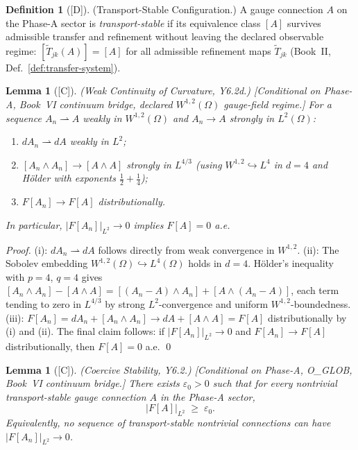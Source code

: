 \documentclass[12pt,oneside]{amsbook}
\theoremstyle{plain}
\newtheorem{lemma}[theorem]{Lemma}
\theoremstyle{definition}
\newtheorem{definition}[theorem]{Definition}
\theoremstyle{remark}
\newcommand{\status}[1]{\textup{[#1]}}
\begin{document}
\begin{definition}[\status{D}]\label{def:ym-transport-stable-config}
\textup{(Transport-Stable Configuration.)}
A gauge connection $A$ on the Phase-A sector is
\emph{transport-stable} if its equivalence class $[A]$ survives
admissible transfer and refinement without leaving the declared
observable regime: $[\widetilde{T}_{jk}(A)] = [A]$ for all
admissible refinement maps $\widetilde{T}_{jk}$ (Book~II,
Def.~\ref{def:transfer-system}).
\end{definition}

\begin{lemma}[\status{C}]\label{lem:ym-weak-curvature-continuity}
\textup{(Weak Continuity of Curvature, Y6.2d.)}
\textup{[Conditional on Phase-A, Book~VI continuum bridge, declared
$W^{1,2}(\Omega)$ gauge-field regime.]}
For a sequence $A_n \rightharpoonup A$ weakly in
$W^{1,2}(\Omega)$ and $A_n \to A$ strongly in $L^2(\Omega)$:
\begin{enumerate}[label=\textup{(\roman*)}]
 \item $dA_n \rightharpoonup dA$ weakly in $L^2$;
 \item $[A_n \wedge A_n] \to [A \wedge A]$ strongly in
 $L^{4/3}$ (using $W^{1,2} \hookrightarrow L^4$ in
 $d=4$ and H\"older with exponents $\tfrac{1}{2}+\tfrac{1}{4}$);
 \item $F[A_n] \to F[A]$ distributionally.
\end{enumerate}
In particular, $|F[A_n]|_{L^2} \to 0$ implies $F[A]=0$ a.e.
\end{lemma}

\begin{proof}
(i): $dA_n \rightharpoonup dA$ follows directly from weak
convergence in $W^{1,2}$.
(ii): The Sobolev embedding $W^{1,2}(\Omega) \hookrightarrow
L^4(\Omega)$ holds in $d=4$. H\"older's inequality with
$p=4$, $q=4$ gives $[A_n \wedge A_n] - [A \wedge A]
= [( A_n-A) \wedge A_n] + [A \wedge (A_n-A)]$, each term
tending to zero in $L^{4/3}$ by strong $L^2$-convergence
and uniform $W^{1,2}$-boundedness.
(iii): $F[A_n] = dA_n + [A_n \wedge A_n] \to dA + [A \wedge A]
= F[A]$ distributionally by (i) and (ii).
The final claim follows: if $|F[A_n]|_{L^2} \to 0$ and
$F[A_n] \to F[A]$ distributionally, then $F[A] = 0$ a.e. \qed
\end{proof}

\begin{lemma}[\status{C}]\label{thm:coercive-stability}
\textup{(Coercive Stability, Y6.2.)}
\textup{[Conditional on Phase-A, O\_GLOB, Book~VI continuum bridge.]}
There exists $\varepsilon_0 > 0$ such that for every nontrivial
transport-stable gauge connection $A$ in the Phase-A sector,
\[
 |F[A]|_{L^2} \;\geq\; \varepsilon_0.
\]
Equivalently, no sequence of transport-stable nontrivial connections
can have $|F[A_n]|_{L^2} \to 0$.
\end{lemma}
\end{document}
